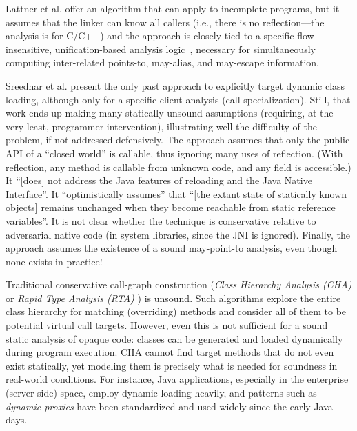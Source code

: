 Lattner et al. \cite{pldi:2007:Lattner} offer an algorithm that can apply to incomplete
programs, but it assumes that the linker can know all callers (i.e.,
there is no reflection---the analysis is for C/C++) and the approach
is closely tied to a specific flow-insensitive, unification-based
analysis logic~\cite{popl:1996:Steensgaard}, necessary
for simultaneously computing inter-related points-to, may-alias, and
may-escape information.

Sreedhar et al. \cite{pldi:2000:Sreedhar} present the
only past approach to explicitly target dynamic class loading,
although only for a specific client analysis (call
specialization). Still, that work ends up making many statically
unsound assumptions (requiring, at the very least, programmer
intervention), illustrating well the difficulty of the problem, if not
addressed defensively. The approach assumes that only the public API
of a ``closed world'' is callable, thus ignoring many uses of
reflection. (With reflection, any method is callable from unknown
code, and any field is accessible.) It ``[does] not address the Java
features of reloading and the Java Native Interface''. It
``optimistically assumes'' that ``[the extant state of statically
  known objects] remains unchanged when they become reachable from
static reference variables''. It is not clear whether the technique is
conservative relative to adversarial native code (in system libraries,
since the JNI is ignored). Finally, the approach assumes the existence
of a sound may-point-to analysis, even though none exists in practice!

Traditional conservative call-graph construction (\emph{Class
  Hierarchy Analysis (CHA)} \cite{ecoop:1995:Dean} or
\emph{Rapid Type Analysis (RTA)} \cite{oopsla:1996:Bacon}) is
unsound.  Such algorithms explore the entire class hierarchy for
matching (overriding) methods and consider all of them to be potential
virtual call targets. However, even this is not sufficient for a sound static
analysis of opaque code: classes can be generated and loaded
dynamically during program execution. CHA cannot find target methods
that do not even exist statically, yet modeling them is precisely what
is needed for soundness in real-world conditions. For instance, Java
applications, especially in the enterprise (server-side) space, employ
dynamic loading heavily, and patterns such as \emph{dynamic proxies}
have been standardized and used widely since the early Java days.

